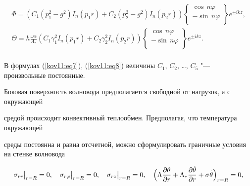 \begin{equation}\label{kov11:eq8}

\begin{array}{l}

\Phi  = \left( {C_1 \left( {p_1^2  - g^2 } \right)I_n (p_1 r) + C_2 \left( {p_2^2  - g^2 } \right)I_n (p_2 r)} \right)

\left\{

\begin{array}{l}

\cos \,n\varphi  \\

- \sin \,n\varphi  \\

\end{array}

\right\}e^{ \pm ikz} , \\

\Theta  = h\displaystyle\frac{{\omega \alpha }}{{\Lambda _* }}\left( {C_1 \gamma _1^2 I_n (p_1 r) + C_2 \gamma _2^2 I_n (p_2 r)}\right)

\left\{

\begin{array}{l}

\cos \,n\varphi  \\

- \sin \,n\varphi  \\

\end{array}

\right\}e^{ \pm ikz} . \\

\end{array}

\end{equation}

В формулах (\ref{kov11:eq7}), (\ref{kov11:eq8}) величины $C_1$, $C_2$, \dots, $C_5$ "--- произвольные постоянные.



\smallskip




Боковая поверхность волновода предполагается свободной от нагрузок, а с окружающей

средой происходит конвективный теплообмен. Предполагая, что температура окружающей

среды постоянна и равна отсчетной, можно сформулировать граничные условия на стенке волновода

\begin{equation}\label{kov11:eq9}

\sigma _{rr} \big|_{r = R}  = 0, \quad

\sigma _{r\varphi } \big|_{r = R}  = 0, \quad

\sigma _{rz} \big|_{r = R}  = 0, \quad

\Bigl( \Lambda \frac{{\partial \theta }}{{\partial r}} + \Lambda _* \frac{{\partial \dot \theta }}{{\partial r}} + \sigma \dot \theta \Bigr)_{r = R}  = 0,

\end{equation}

